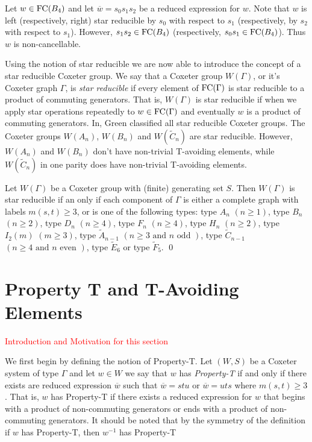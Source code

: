 \begin{example}
Let $w \in \mathrm{FC}(B_4)$ and let $\overline{w}=s_0s_1s_2$ be a reduced expression for $w$. Note that $w$ is left (respectively, right) star reducible by $s_0$ with respect to $s_1$ (respectively, by $s_2$ with respect to $s_1$). However, $s_1s_2 \in \mathrm{FC}(B_4)$ (respectively, $s_0s_1 \in \mathrm{FC}(B_4)$). Thus $w$ is non-cancellable.
\end{example}

Using the notion of star reducible we are now able to introduce the concept of a star reducible Coxeter group. We say that a Coxeter group $W(\Gamma)$, or it's Coxeter graph $\Gamma$, is \emph{star reducible} if every element of $\mathrm{FC}(\Gamma)$ is star reducible to a product of commuting generators. That is, $W(\Gamma)$ is star reducible if when we apply star operations repeatedly to $w \in \mathrm{FC}(\Gamma)$ and eventually $w$ is a product of commuting generators. In\cite{Green2006a}, Green classified all star reducible Coxeter groups. The Coxeter groups $W(A_n)$, $W(B_n)$ and $W(\widetilde{C}_n)$ are star reducible. However, $W(A_n)$ and $W(B_n)$ don't have non-trivial T-avoiding elements, while $W(\widetilde{C}_n)$ in one parity does have non-trivial T-avoiding elements.
\begin{theorem}
	Let $W(\Gamma)$ be a Coxeter group with (finite) generating set $S$. Then $W(\Gamma)$ is star reducible if an only if each component of $\Gamma$ is either a complete graph with labels $m(s,t)\geq 3$, or is one of the following types: type $A_n$ $(n \geq 1)$, type $B_n$ $(n \geq 2)$, type $D_n$ $(n \geq 4)$, type $F_n$ $(n \geq 4)$, type $H_n$ $(n \geq 2)$, type $I_2(m)$ $(m \geq 3)$, type $\widetilde{A}_{n-1}$ $(n \geq 3 \textrm{ and } n \textrm{ odd })$, type $\widetilde{C}_{n-1}$ $(n\geq 4 \textrm{ and } n \textrm{ even })$, type $\widetilde{E}_6$ or type $\widetilde{F}_5$. \qed
\end{theorem}  


\section{Property T and T-Avoiding Elements}\label{Tavoid}

\textcolor{red}{Introduction and Motivation for this section}

We first begin by defining the notion of Property-T. Let $(W,S)$ be a Coxeter system of type $\Gamma$ and let $w \in W$ we say that $w$ has \emph{Property-T} if and only if there exists are reduced expression $\overline{w}$ such that $\overline{w}=stu$ or $\overline{w}=uts$ where $m(s,t)\geq 3$. That is, $w$ has Property-T if there exists a reduced expression for $w$ that begins with a product of non-commuting generators or ends with a product of non-commuting generators. It should be noted that by the symmetry of the definition if $w$ has Property-T, then $w^{-1}$ has Property-T

